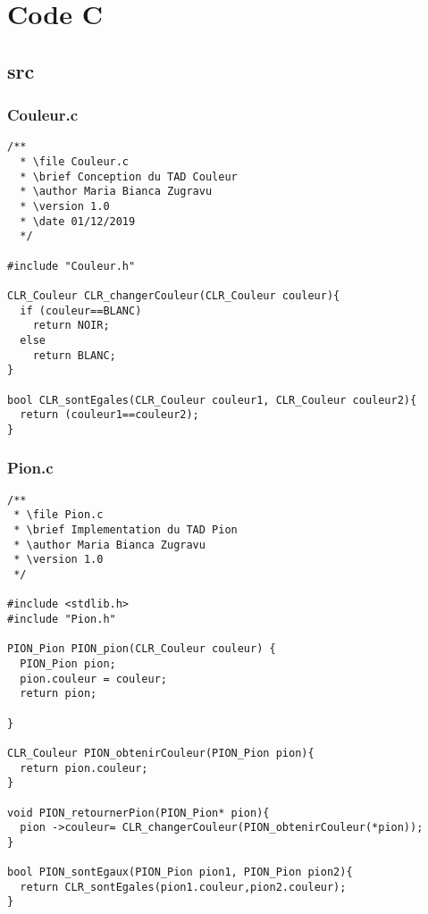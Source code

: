 \section{Code C}
\subsection{src}

\subsubsection{Couleur.c}
\begin{lstlisting}
/**
  * \file Couleur.c
  * \brief Conception du TAD Couleur
  * \author Maria Bianca Zugravu
  * \version 1.0
  * \date 01/12/2019
  */

#include "Couleur.h"

CLR_Couleur CLR_changerCouleur(CLR_Couleur couleur){
  if (couleur==BLANC)
    return NOIR;
  else
    return BLANC;
}

bool CLR_sontEgales(CLR_Couleur couleur1, CLR_Couleur couleur2){
  return (couleur1==couleur2);
}
\end{lstlisting}
  

\subsubsection{Pion.c}
\begin{lstlisting}
/**
 * \file Pion.c
 * \brief Implementation du TAD Pion
 * \author Maria Bianca Zugravu
 * \version 1.0
 */

#include <stdlib.h>
#include "Pion.h"

PION_Pion PION_pion(CLR_Couleur couleur) {
  PION_Pion pion;
  pion.couleur = couleur;
  return pion;

}

CLR_Couleur PION_obtenirCouleur(PION_Pion pion){
  return pion.couleur;
}

void PION_retournerPion(PION_Pion* pion){
  pion ->couleur= CLR_changerCouleur(PION_obtenirCouleur(*pion));
}

bool PION_sontEgaux(PION_Pion pion1, PION_Pion pion2){
  return CLR_sontEgales(pion1.couleur,pion2.couleur);
}
  
\end{lstlisting}

